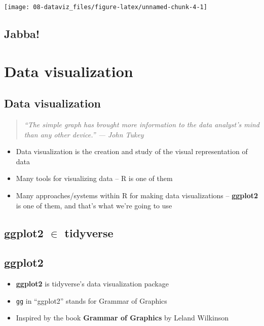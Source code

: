 \documentclass[
]{book}
\providecommand{\tightlist}{%
  \setlength{\itemsep}{0pt}\setlength{\parskip}{0pt}}
\theoremstyle{definition}
\theoremstyle{definition}
\theoremstyle{definition}
\theoremstyle{definition}
\theoremstyle{remark}
\begin{document}
\begin{center}\texttt{[image: 08-dataviz\_files/figure-latex/unnamed-chunk-4-1]} \end{center}

\hypertarget{jabba}{%
\section{Jabba!}\label{jabba}}

\hypertarget{data-visualization}{%
\chapter{Data visualization}\label{data-visualization}}

\hypertarget{data-visualization-1}{%
\section{Data visualization}\label{data-visualization-1}}

\begin{quote}
\emph{``The simple graph has brought more information to the data analyst's mind than any other device.'' --- John Tukey}
\end{quote}

\begin{itemize}
\tightlist
\item
  Data visualization is the creation and study of the visual representation of data
\item
  Many tools for visualizing data -- R is one of them
\item
  Many approaches/systems within R for making data visualizations -- \textbf{ggplot2} is one of them, and that's what we're going to use
\end{itemize}

\hypertarget{ggplot2-in-tidyverse}{%
\section{\texorpdfstring{ggplot2 \(\in\) tidyverse}{ggplot2 \textbackslash in tidyverse}}\label{ggplot2-in-tidyverse}}

\hypertarget{ggplot2}{%
\section{ggplot2}\label{ggplot2}}

\begin{itemize}
\tightlist
\item
  \textbf{ggplot2} is tidyverse's data visualization package
\item
  \texttt{gg} in ``ggplot2'' stands for Grammar of Graphics
\item
  Inspired by the book \textbf{Grammar of Graphics} by Leland Wilkinson
\end{itemize}
\end{document}
